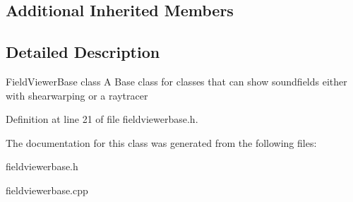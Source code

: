 \subsection*{Additional Inherited Members}


\subsection{Detailed Description}
Field\-Viewer\-Base class A Base class for classes that can show soundfields either with shearwarping or a raytracer 

Definition at line 21 of file fieldviewerbase.\-h.



The documentation for this class was generated from the following files\-:\begin{DoxyCompactItemize}
\item 
fieldviewerbase.\-h\item 
fieldviewerbase.\-cpp\end{DoxyCompactItemize}
